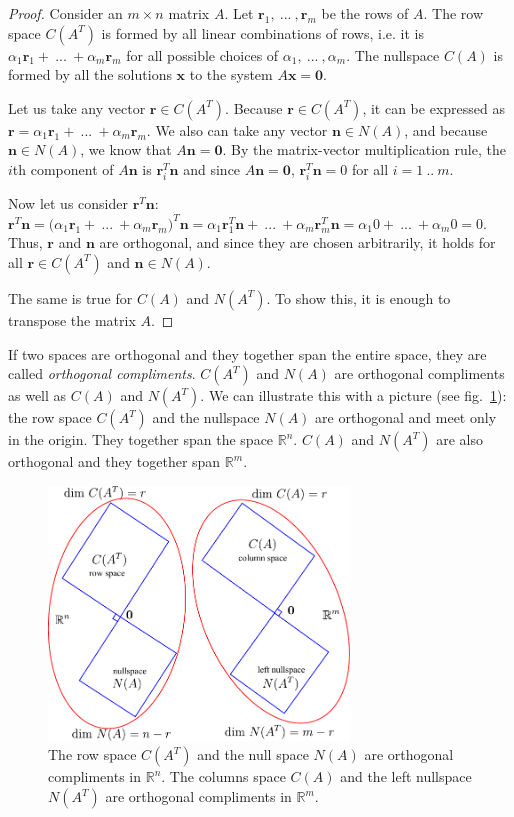\documentclass{acm_proc_article-sp}
\begin{document}
\begin{proof}
Consider an $m \times n$ matrix $A$. Let $\mathbf r_1 , \ ... \ , \mathbf r_m$ be the rows of $A$. The row space $C(A^T)$ is formed by all linear combinations of rows, i.e. it is $\alpha_1 \mathbf r_1 + \ ... \ + \alpha_m \mathbf r_m$ for all possible choices of $\alpha_1, \ ... \ , \alpha_m$.
The nullspace $C(A)$ is formed by all the solutions $\mathbf x$ to the system $A \mathbf x = \mathbf 0$.

Let us take any vector $\mathbf r \in C(A^T)$. Because $\mathbf r \in C(A^T)$, it can be expressed as $\mathbf r = \alpha_1 \mathbf r_1 + \ ... \ + \alpha_m \mathbf r_m$. We also can take any vector $\mathbf n \in N(A)$, and because $\mathbf n \in N(A)$, we know that $A \mathbf n = \mathbf 0$. By the matrix-vector multiplication rule, the $i$th component of $A \mathbf n$ is $\mathbf r_i^T \mathbf n$ and since $A \mathbf n = \mathbf 0$, $\mathbf r_i^T \mathbf n = 0$ for all $i = 1 \ .. \ m$.

Now let us consider $\mathbf r^T \mathbf n$: $\mathbf r^T \mathbf n = \big( \alpha_1 \mathbf r_1 + \ ... \ + \alpha_m \mathbf r_m \big)^T \mathbf n = \alpha_1 \mathbf r_1^T \mathbf n  + \ ... \ + \alpha_m \mathbf r_m^T \mathbf n = \alpha_1 0 + \ ... \ + \alpha_m 0 = 0$. Thus, $\mathbf r$ and $\mathbf n$ are orthogonal, and since they are chosen arbitrarily, it holds for all $\mathbf r \in C(A^T)$ and $\mathbf n \in N(A)$.

The same is true for \(C(A)\) and \(N(A^T)\). To show this, it is enough to transpose the matrix $A$.\end{proof}

If two spaces are orthogonal and they together span the entire space,
they are called \emph{orthogonal compliments}. \(C(A^T)\) and \(N(A)\)
are orthogonal compliments as well as \(C(A)\) and \(N(A^T)\). We can illustrate this with a picture (see fig.~\ref{fig:diagram0}): the row space $C(A^T)$ and the nullspace $N(A)$ are orthogonal and meet only in the origin. They together span the space $\mathbb R^n$. $C(A)$ and $N(A^T)$ are also orthogonal and they together span $\mathbb R^m$.


\begin{figure}%
\centering
\includegraphics[width=8cm]{diagram0.pdf}
\caption{The row space $C(A^T)$ and the null space $N(A)$ are orthogonal
compliments in $\mathbb R^n$. The columns space $C(A)$ and the left nullspace $N(A^T)$ are orthogonal compliments in $\mathbb R^m$.}
\label{fig:diagram0}
\end{figure}
\end{document}

